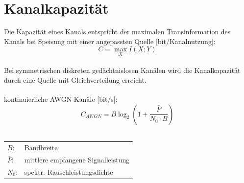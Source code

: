 \section{Kanalkapazität}
Die Kapazität eines Kanals entspricht der maximalen Transinformation des Kanals 
bei Speisung mit einer angepassten Quelle [bit/Kanalnutzung]:
\[ C = \max_X I(X;Y) \]
~\\
Bei symmetrischen diskreten gedächtnislosen Kanälen wird die Kanalkapazität 
durch eine Quelle mit Gleichverteilung erreicht. 
\\\\
kontinuierliche AWGN-Kanäle [bit/s]:
\[ C_{AWGN} = B\log_2\left(1+\frac{\bar{P}}{N_0 \cdot B}\right) \]
~\\
\begin{footnotesize}
\begin{tabular}{ll}
	$B$:	& Bandbreite \\
	$\bar{P}$:	& mittlere empfangene Signalleistung \\
	$N_0$:&	spektr. Rauschleistungsdichte
\end{tabular}
\end{footnotesize}
